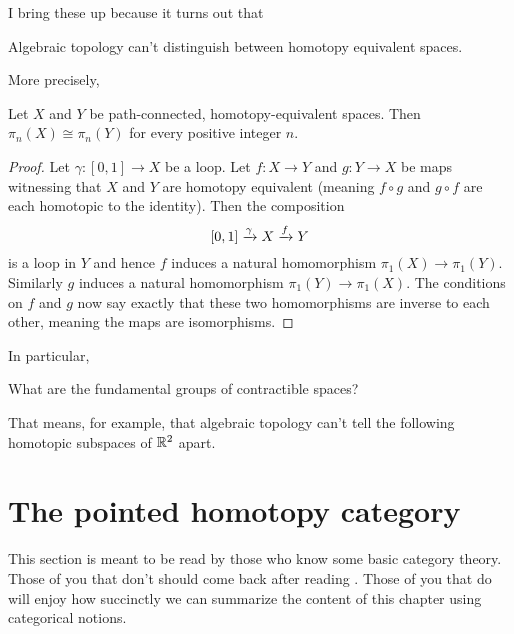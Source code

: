I bring these up because it turns out that
\begin{moral}
	Algebraic topology can't distinguish between homotopy equivalent spaces.
\end{moral}
More precisely,
\begin{theorem}
	\label{thm:fundgrp_homotopy_invariant}
	Let $X$ and $Y$ be path-connected, homotopy-equivalent spaces.
	Then $\pi_n(X) \cong \pi_n(Y)$ for every positive integer $n$.
\end{theorem}
\begin{proof}
	Let $\gamma \colon [0,1] \to X$ be a loop.
	Let $f \colon X \to Y$ and $g \colon Y \to X$ be maps witnessing that $X$ and $Y$ are homotopy equivalent
	(meaning $f \circ g$ and $g \circ f$ are each homotopic to the identity).
	Then the composition
	\[ [0,1] \xrightarrow{\gamma} X \xrightarrow{f} Y \]
	is a loop in $Y$ and hence $f$ induces a natural homomorphism $\pi_1(X) \to \pi_1(Y)$.
	Similarly $g$ induces a natural homomorphism $\pi_1(Y) \to \pi_1(X)$.
	The conditions on $f$ and $g$ now say exactly that these two homomorphisms
	are inverse to each other, meaning the maps are isomorphisms.
\end{proof}
In particular,
\begin{ques}
	What are the fundamental groups of contractible spaces?
\end{ques}

That means, for example, that algebraic topology can't tell
the following homotopic subspaces of $\mathbb R^2$ apart.
\begin{center}
	{\color{red} \Huge \venus}
	\qquad
	{\color{blue} \Huge \mars}
\end{center}

\section{The pointed homotopy category}
This section is meant to be read by those who know some basic category theory.
Those of you that don't should come back after reading .
Those of you that do will enjoy how succinctly we can summarize
the content of this chapter using categorical notions.

